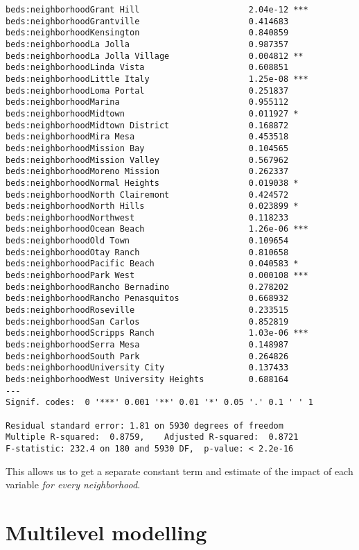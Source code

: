 \documentclass[
  letterpaper,
  krantz2]{style/krantz}
\begin{document}
\begin{verbatim}
beds:neighborhoodGrant Hill                      2.04e-12 ***
beds:neighborhoodGrantville                      0.414683    
beds:neighborhoodKensington                      0.840859    
beds:neighborhoodLa Jolla                        0.987357    
beds:neighborhoodLa Jolla Village                0.004812 ** 
beds:neighborhoodLinda Vista                     0.608851    
beds:neighborhoodLittle Italy                    1.25e-08 ***
beds:neighborhoodLoma Portal                     0.251837    
beds:neighborhoodMarina                          0.955112    
beds:neighborhoodMidtown                         0.011927 *  
beds:neighborhoodMidtown District                0.168872    
beds:neighborhoodMira Mesa                       0.453518    
beds:neighborhoodMission Bay                     0.104565    
beds:neighborhoodMission Valley                  0.567962    
beds:neighborhoodMoreno Mission                  0.262337    
beds:neighborhoodNormal Heights                  0.019038 *  
beds:neighborhoodNorth Clairemont                0.424572    
beds:neighborhoodNorth Hills                     0.023899 *  
beds:neighborhoodNorthwest                       0.118233    
beds:neighborhoodOcean Beach                     1.26e-06 ***
beds:neighborhoodOld Town                        0.109654    
beds:neighborhoodOtay Ranch                      0.810658    
beds:neighborhoodPacific Beach                   0.040583 *  
beds:neighborhoodPark West                       0.000108 ***
beds:neighborhoodRancho Bernadino                0.278202    
beds:neighborhoodRancho Penasquitos              0.668932    
beds:neighborhoodRoseville                       0.233515    
beds:neighborhoodSan Carlos                      0.852819    
beds:neighborhoodScripps Ranch                   1.03e-06 ***
beds:neighborhoodSerra Mesa                      0.148987    
beds:neighborhoodSouth Park                      0.264826    
beds:neighborhoodUniversity City                 0.137433    
beds:neighborhoodWest University Heights         0.688164    
---
Signif. codes:  0 '***' 0.001 '**' 0.01 '*' 0.05 '.' 0.1 ' ' 1

Residual standard error: 1.81 on 5930 degrees of freedom
Multiple R-squared:  0.8759,    Adjusted R-squared:  0.8721 
F-statistic: 232.4 on 180 and 5930 DF,  p-value: < 2.2e-16
\end{verbatim}

This allows us to get a separate constant term and estimate of the
impact of each variable \emph{for every neighborhood}.

\hypertarget{multilevel-modelling}{%
\chapter{Multilevel modelling}\label{multilevel-modelling}}
\end{document}
